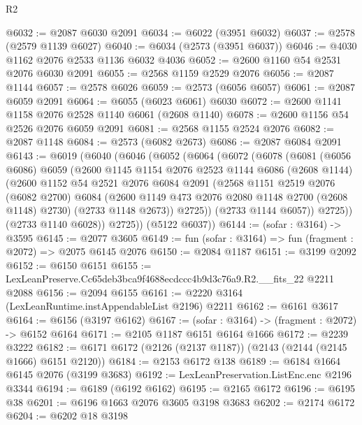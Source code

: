 \begin{lexlean}{R2}
\begin{coremodule}
@6032 := @2087 @6030 @2091
@6034 := @6022 (@3951 @6032)
@6037 := @2578 (@2579 @1139 @6027)
@6040 := @6034 (@2573 (@3951 @6037))
@6046 := @4030 @1162 @2076 @2533 @1136 @6032 @4036
@6052 := @2600 @1160 @54 @2531 @2076 @6030 @2091
@6055 := @2568 @1159 @2529 @2076
@6056 := @2087 @1144
@6057 := @2578 @6026
@6059 := @2573 (@6056 @6057)
@6061 := @2087 @6059 @2091
@6064 := @6055 (@6023 @6061) @6030
@6072 := @2600 @1141 @1158 @2076 @2528 @1140 @6061 (@2608 @1140)
@6078 := @2600 @1156 @54 @2526 @2076 @6059 @2091
@6081 := @2568 @1155 @2524 @2076
@6082 := @2087 @1148
@6084 := @2573 (@6082 @2673)
@6086 := @2087 @6084 @2091
@6143 := @6019
    (@6040
      (@6046
        (@6052
          (@6064
            (@6072
              (@6078
                (@6081
                  (@6056 @6086)
                  @6059
                  (@2600
                    @1145
                    @1154
                    @2076
                    @2523
                    @1144
                    @6086
                    (@2608 @1144)
                    (@2600
                      @1152
                      @54
                      @2521
                      @2076
                      @6084
                      @2091
                      (@2568
                        @1151
                        @2519
                        @2076
                        (@6082 @2700)
                        @6084
                        (@2600 @1149 @473 @2076 @2080 @1148 @2700 (@2608 @1148) @2730)
                        (@2733 @1148 @2673))
                      @2725))
                  (@2733 @1144 @6057))
                @2725))
            (@2733 @1140 @6028))
          @2725))
      (@5122 @6037))
@6144 := (sofar : @3164) -> @3595
@6145 := @2077 @3605
@6149 := fun (sofar : @3164) => fun (fragment : @2072) => @2075 @6145 @2076
@6150 := @2084 @1187
@6151 := @3199 @2092
@6152 := @6150 @6151
@6155 := LexLeanPreserve.Cc65deb3bca9f4688ecdccc4b9d3c76a9.R2.__fits_22 @2211 @2088
@6156 := @2094 @6155
@6161 := @2220 @3164 (LexLeanRuntime.instAppendableList @2196) @2211
@6162 := @6161 @3617
@6164 := @6156 (@3197 @6162)
@6167 := (sofar : @3164) -> (fragment : @2072) -> @6152 @6164
@6171 := @2105 @1187 @6151 @6164 @1666
@6172 := @2239 @3222
@6182 := @6171 @6172 (@2126 (@2137 @1187)) (@2143 (@2144 (@2145 @1666) @6151 @2120))
@6184 := @2153 @6172 @138
@6189 := @6184 @1664 @6145 @2076 (@3199 @3683)
@6192 := LexLeanPreservation.ListEnc.enc @2196 @3344
@6194 := @6189 (@6192 @6162)
@6195 := @2165 @6172
@6196 := @6195 @38
@6201 := @6196 @1663 @2076 @3605 @3198 @3683
@6202 := @2174 @6172
@6204 := @6202 @18 @3198

\end{coremodule}
\end{lexlean}
